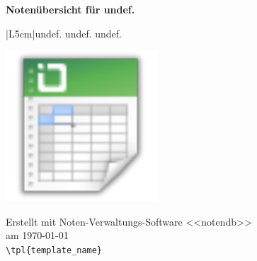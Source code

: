 \documentclass[a4paper]{minimal}
\newcommand{\tpl}[1]{undef.}
\begin{document}
\hline
\vspace{0.4cm}
\centerline{\bfseries Notenübersicht für \tpl{Name} }
\vspace{0.4cm}
\hline


\vspace{2cm}


\begin{tabular}{|L{5cm}|\tpl{morecols}}
\hline
\tpl{Fach} \tpl{Noten} \\
\hline
\end{tabular}


\vfill

\hline
\vspace{0.15cm}

\includegraphics[scale=0.25]{icon}


\vspace{-1cm}

{\addtolength{\leftskip}{13mm} 


Erstellt mit Noten-Verwaltungs-Software <<notendb>> \\ am \today
\\
\verb|\tpl{template_name}|
\par}
\vspace{0.2cm}
\hline
\end{document}
